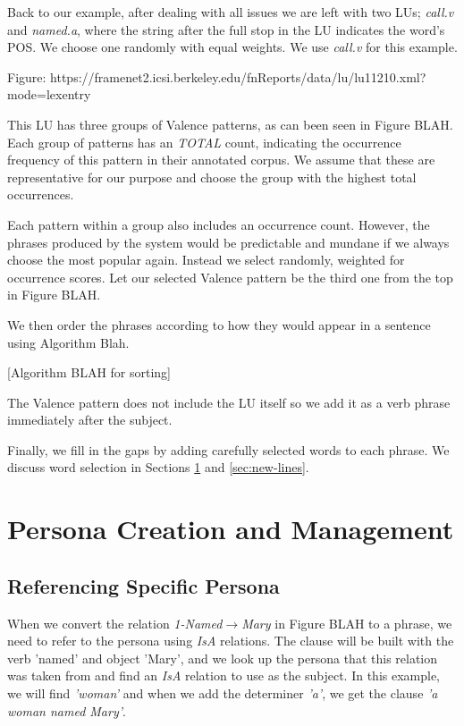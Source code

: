 Back to our example, after dealing with all issues we are left with two LUs; \textit{call.v} and \textit{named.a}, where the string after the full stop in the LU indicates the word's POS. We choose one randomly with equal weights. We use \textit{call.v} for this example.

Figure: https://framenet2.icsi.berkeley.edu/fnReports/data/lu/lu11210.xml?mode=lexentry

This LU has three groups of Valence patterns, as can been seen in Figure BLAH. Each group of patterns has an \textit{TOTAL} count, indicating the occurrence frequency of this pattern in their annotated corpus. We assume that these are representative for our purpose and choose the group with the highest total occurrences.

Each pattern within a group also includes an occurrence count. However, the phrases produced by the system would be predictable and mundane if we always choose the most popular again. Instead we select randomly, weighted for occurrence scores. Let our selected Valence pattern be the third one from the top in Figure BLAH.

We then order the phrases according to how they would appear in a sentence using Algorithm Blah.

[Algorithm BLAH for sorting]

The Valence pattern does not include the LU itself so we add it as a verb phrase immediately after the subject.

Finally, we fill in the gaps by adding carefully selected words to each phrase. We discuss word selection in Sections  \ref{sec:persona} and \ref{sec:new-lines}.

\section{Persona Creation and Management}
\label{sec:persona}
\subsection{Referencing Specific Persona}
When we convert the relation \textit{1-Named$\rightarrow$Mary} in Figure BLAH to a phrase, we need to refer to the persona using \textit{IsA} relations. The clause will be built with the verb 'named' and object 'Mary', and we look up the persona that this relation was taken from and find an \textit{IsA} relation to use as the subject. In this example, we will find \textit{'woman'} and when we add the determiner \textit{'a'}, we get the clause \textit{'a woman named Mary'}.

